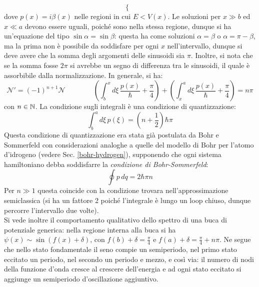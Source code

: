 \begin{example}
\begin{equation*}
\begin{cases}
		\end{cases}
	\end{equation*}
	dove $ p(x) = i \beta(x) $ nelle regioni in cui $ E < V(x) $. Le soluzioni per $ x \gg b $ ed $ x \ll a $ devono essere uguali, poiché sono nella stessa regione, dunque si ha un'equazione del tipo $ \sin \alpha = \sin \beta $: questa ha come soluzioni $ \alpha = \beta $ o $ \alpha = \pi - \beta $, ma la prima non è possibile da soddisfare per ogni $ x $ nell'intervallo, dunque si deve avere che la somma degli argomenti delle sinusoidi sia $ \pi $. Inoltre, si nota che se la somma fosse $ 2\pi $ si avrebbe un segno di differenza tra le sinusoidi, il quale è assorbibile dalla normalizzazione. In generale, si ha:
	\begin{equation*}
		\mathcal{N}' = (-1)^{n + 1} \mathcal{N}
		\qquad \qquad
		\left( \int_b^x d\xi\, \frac{p(x)}{\hbar} + \frac{\pi}{4} \right) + \left( \int_x^a d\xi\, \frac{p(x)}{\hbar} + \frac{\pi}{4} \right) = n\pi
	\end{equation*}
	con $ n \in \mathbb{N} $. La condizione sugli integrali è una condizione di quantizzazione:
	\begin{equation*}
		\int_b^a d\xi\, p(\xi) = \left( n + \frac{1}{2} \right) \hbar \pi
	\end{equation*}
	Questa condizione di quantizzazione era stata già postulata da Bohr e Sommerfeld con considerazioni analoghe a quelle del modello di Bohr per l'atomo d'idrogeno (vedere Sec. \ref{bohr-hydrogen}), supponendo che ogni sistema hamiltoniano debba soddisfarre la \textit{condizione di Bohr-Sommerfeld}:
	\begin{equation}
		\oint p\,dq = 2\hbar \pi n
		\label{eq:4.31}
	\end{equation}
	Per $ n \gg 1 $ questa coincide con la condizione trovara nell'approssimazione semiclassica (si ha un fattore 2 poiché l'integrale è lungo un loop chiuso, dunque percorre l'intervallo due volte).\\
	Si vede inoltre il comportamento qualitativo dello spettro di una buca di potenziale generica: nella regione interna alla buca si ha $ \psi(x) \sim \sin (f(x) + \delta) $, con $ f(b) + \delta = \frac{\pi}{4} $ e $ f(a) + \delta = \frac{\pi}{4} + n\pi $. Ne segue che nello stato fondamentale il seno compie un semiperiodo, nel primo stato eccitato un periodo, nel secondo un periodo e mezzo, e così via: il numero di nodi della funzione d'onda cresce al crescere dell'energia e ad ogni stato eccitato si aggiunge un semiperiodo d'oscillazione aggiuntivo.
\end{example}










